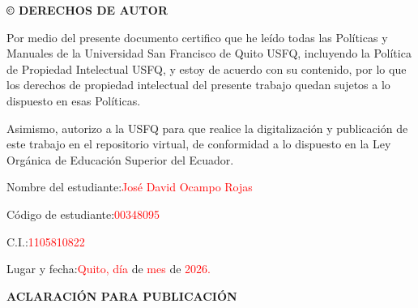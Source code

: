 \begin{center}
    \textbf{\fontsize{14}{16}\selectfont © DERECHOS DE AUTOR}\\
    \vspace{10pt}
\end{center}

\fontsize{12}{14}\selectfont
{
    \setlength{\parindent}{3em}
    \hspace{1pt}

    Por medio del presente documento certifico que he leído todas las Políticas y Manuales de la Universidad San Francisco de Quito USFQ, incluyendo la Política de Propiedad Intelectual USFQ, y estoy de acuerdo con su contenido, por lo que los derechos de propiedad intelectual del presente trabajo quedan sujetos a lo dispuesto en esas Políticas.

    Asimismo, autorizo a la USFQ para que realice la digitalización y publicación de este trabajo en el repositorio virtual, de conformidad a lo dispuesto en la Ley Orgánica de Educación Superior del Ecuador.
}

\begin{customfontsize}
    \vspace{30pt}

    Nombre del estudiante:\hspace{4cm}\textcolor{red}  {José David Ocampo Rojas}\\
    \vspace{30pt}

    Código de estudiante:\hspace{4.2cm}\textcolor{red}{00348095}\\
    \vspace{30pt}

    C.I.:\hspace{7.3cm}\textcolor{red}{1105810822}\\
    \vspace{30pt}

    Lugar y fecha:\hspace{5.4cm}\textcolor{red}{Quito, día} de \textcolor{red}{mes} de \textcolor{red}{2026.}

\end{customfontsize}

\newpage

\begin{center}
    \textbf{\fontsize{14}{16}\selectfont ACLARACIÓN PARA PUBLICACIÓN}\\
\end{center}
\vspace{10pt}

